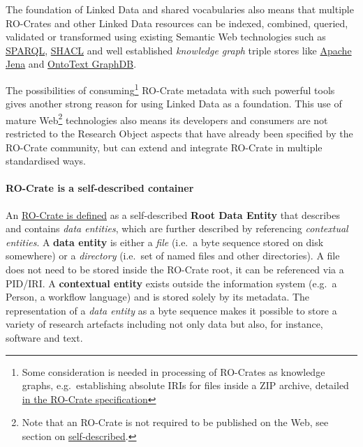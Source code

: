 The foundation of Linked Data and shared vocabularies also means that
multiple RO-Crates and other Linked Data resources can be indexed,
combined, queried, validated or transformed using existing Semantic Web
technologies such as
\href{https://www.w3.org/TR/sparql11-overview}{SPARQL},
\href{https://www.w3.org/TR/shacl/}{SHACL} and well established
\emph{knowledge graph} triple stores like
\href{https://jena.apache.org/}{Apache Jena} and
\href{https://www.ontotext.com/products/graphdb/}{OntoText GraphDB}.

The possibilities of consuming\footnote{Some consideration is needed in
  processing of RO-Crates as knowledge graphs, e.g.~establishing
  absolute IRIs for files inside a ZIP archive, detailed
  \href{https://www.researchobject.org/ro-crate/1.1/appendix/relative-uris.html}{in
  the RO-Crate specification}} RO-Crate metadata with such powerful
tools gives another strong reason for using Linked Data as a foundation.
This use of mature Web\footnote{Note that an RO-Crate is not required to
  be published on the Web, see section on
  \protect\hyperlink{selfdescribed}{self-described}.} technologies also
means its developers and consumers are not restricted to the Research
Object aspects that have already been specified by the RO-Crate
community, but can extend and integrate RO-Crate in multiple
standardised ways.

\hypertarget{selfdescribed}{%
\paragraph{RO-Crate is a self-described container}\label{selfdescribed}}

An
\href{https://www.researchobject.org/ro-crate/1.1/structure.html\#ro-crate-metadata-file-ro-crate-metadatajson}{RO-Crate
is defined} as a self-described \textbf{Root Data Entity} that describes
and contains \emph{data entities}, which are further described by
referencing \emph{contextual entities}. A \textbf{data entity} is either
a \emph{file} (i.e.~a byte sequence stored on disk somewhere) or a
\emph{directory} (i.e.~set of named files and other directories). A file
does not need to be stored inside the RO-Crate root, it can be
referenced via a PID/IRI. A \textbf{contextual entity} exists outside
the information system (e.g.~a Person, a workflow language) and is
stored solely by its metadata. The representation of a \emph{data
entity} as a byte sequence makes it possible to store a variety of
research artefacts including not only data but also, for instance,
software and text.

